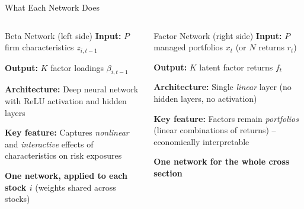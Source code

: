 \documentclass[aspectratio=169]{beamer}
\begin{document}
%
%
\begin{frame}{What Each Network Does}

\begin{columns}[T]
\begin{block}{Beta Network (left side)}
\textbf{Input:} $P$ firm characteristics $z_{i,t-1}$

\textbf{Output:} $K$ factor loadings $\beta_{i,t-1}$

\textbf{Architecture:} Deep neural network with ReLU activation and hidden layers

\textbf{Key feature:} Captures \emph{nonlinear} and \emph{interactive} effects of characteristics on risk exposures

\textbf{One network, applied to each stock $i$} (weights shared across stocks)
\end{block}

\begin{block}{Factor Network (right side)}
\textbf{Input:} $P$ managed portfolios $x_t$ (or $N$ returns $r_t$)

\textbf{Output:} $K$ latent factor returns $f_t$

\textbf{Architecture:} Single \emph{linear} layer (no hidden layers, no activation)

\textbf{Key feature:} Factors remain \emph{portfolios} (linear combinations of returns) -- economically interpretable

\textbf{One network for the whole cross section}
\end{block}
\end{columns}
\end{frame}
%
\end{document}
